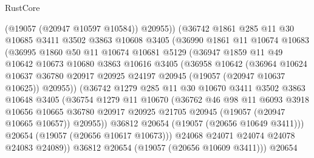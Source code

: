 \begin{lexlean}{RustCore}
\begin{coremodule}
                (@19057 (@20947 @10597 @10584))
                @20955))
            (@36742
              @1861
              @285
              @11
              @30
              @10685
              @3411
              @3502
              @3863
              @10608
              @3405
              (@36990
                @1861
                @11
                @10674
                @10683
                (@36995
                  @1860
                  @50
                  @11
                  @10674
                  @10681
                  @5129
                  (@36947
                    @1859
                    @11
                    @49
                    @10642
                    @10673
                    @10680
                    @3863
                    @10616
                    @3405
                    (@36958
                      @10642
                      (@36964
                        @10624
                        @10637
                        @36780
                        @20917
                        @20925
                        @24197
                        @20945
                        (@19057 (@20947 @10637 @10625))
                        @20955))
                    (@36742
                      @1279
                      @285
                      @11
                      @30
                      @10670
                      @3411
                      @3502
                      @3863
                      @10648
                      @3405
                      (@36754
                        @1279
                        @11
                        @10670
                        (@36762
                          @46
                          @98
                          @11
                          @6093
                          @3918
                          @10656
                          @10665
                          @36780
                          @20917
                          @20925
                          @21705
                          @20945
                          (@19057 (@20947 @10665 @10657))
                          @20955))
                      @36812
                      @20654
                      (@19057 (@20656 @10649 @3411)))
                    @20654
                    (@19057 (@20656 @10617 @10673)))
                  @24068
                  @24071
                  @24074
                  @24078
                  @24083
                  @24089))
              @36812
              @20654
              (@19057 (@20656 @10609 @3411)))
            @20654

\end{coremodule}
\end{lexlean}
